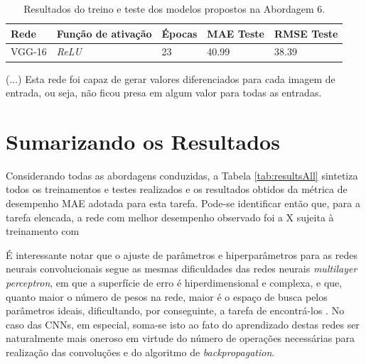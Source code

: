 	\begin{table}[!ht]
	\centering
	\caption{Resultados do treino e teste dos modelos propostos na Abordagem 6.}
	\label{tab:results-7}
		\begin{tabular}{l l l l l }
			\toprule
			Rede & Função de ativação & Épocas & MAE Teste & RMSE Teste \\
			\midrule
			VGG-16 & \emph{ReLU} & 23 & 40.99 & 38.39 \\
			\bottomrule
		\end{tabular}
	\end{table}

	(...)
	Esta rede foi capaz de gerar valores diferenciados para cada imagem de entrada, ou seja, não ficou presa em algum valor para todas as entradas.

\section{Sumarizando os Resultados}

Considerando todas as abordagens conduzidas, a Tabela \ref{tab:resultsAll} sintetiza todos os treinamentos e testes realizados e os resultados obtidos da métrica de desempenho MAE adotada para esta tarefa. Pode-se identificar então que, para a tarefa elencada, a rede com melhor desempenho observado foi a X sujeita à treinamento com 



É interessante notar que o ajuste de parâmetros e hiperparâmetros para as redes neurais convolucionais segue as mesmas dificuldades das redes neurais \emph{multilayer perceptron}, em que a superfície de erro é hiperdimensional e complexa, e que, quanto maior o número de pesos na rede, maior é o espaço de busca pelos parâmetros ideais, dificultando, por conseguinte, a tarefa de encontrá-los \cite{Teresa:Livro}. No caso das CNNs, em especial, soma-se isto ao fato do aprendizado destas redes ser naturalmente mais oneroso em virtude do número de operações necessárias para realização das convoluções e do algoritmo de \emph{backpropagation}.
